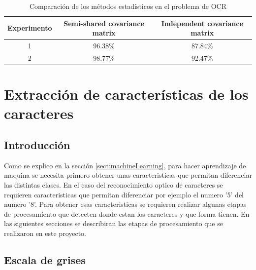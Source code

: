 \documentclass[a4paper, 11pt, oneside]{report}
\begin{document}
	\begin{table}
	\begin{center}
	\begin{tabular}{|c|c|c|}		
		\hline
		Experimento & Semi-shared covariance matrix & Independent covariance matrix \\
		\hline
		1 & 96.38\% & 87.84\% \\
		2 &	98.77\% & 92.47\% \\
		\hline		
	\end{tabular}
	\end{center}
	\caption{Comparación de los métodos estadísticos en el problema de OCR}	
	\label{tb:classifResult}
	\end{table}

\chapter{Extracción de características de los caracteres}
\label{chap:features}

\section{Introducción}

Como se explico en la sección \ref{sect:machineLearning}, para hacer aprendizaje de maquina se necesita primero obtener unas caracteristicas que permitan diferenciar las distintas clases. En el caso del reconocimiento optico de caracteres se requieren caracteristicas que permitan diferenciar por ejemplo el numero '5' del numero '8'. Para obtener esas caracteristicas se requieren realizar algunas etapas de procesamiento que detecten donde estan los caracteres y que forma tienen. En las siguientes secciones se describiran las etapas de procesamiento que se realizaron en este proyecto.

\section{Escala de grises}
\end{document}
